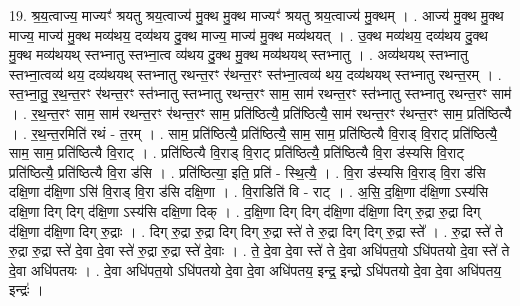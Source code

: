 \documentclass[17pt]{extarticle}
\begin{document}
19. श्र॒य॒त्वाज्य॒ माज्यꣳ॑ श्रयतु श्रय॒त्वाज्य॑ मु॒क्थ मु॒क्थ माज्यꣳ॑ श्रयतु श्रय॒त्वाज्य॑ मु॒क्थम् । . आज्य॑ मु॒क्थ मु॒क्थ माज्य॒ माज्य॑ मु॒क्थ मव्य॑थय॒ दव्य॑थय दु॒क्थ माज्य॒ माज्य॑ मु॒क्थ मव्य॑थयत् । . उ॒क्थ मव्य॑थय॒ दव्य॑थय दु॒क्थ मु॒क्थ मव्य॑थयथ् स्तभ्नातु स्तभ्ना॒त्व व्य॑थय दु॒क्थ मु॒क्थ मव्य॑थयथ् स्तभ्नातु । . अव्य॑थयथ् स्तभ्नातु स्तभ्ना॒त्वव्य॑ थय॒ दव्य॑थयथ् स्तभ्नातु रथन्त॒रꣳ र॑थन्त॒रꣳ स्त॑भ्ना॒त्वव्य॑ थय॒ दव्य॑थयथ् स्तभ्नातु रथन्त॒रम् । . स्त॒भ्ना॒तु॒ र॒थ॒न्त॒रꣳ र॑थन्त॒रꣳ स्त॑भ्नातु स्तभ्नातु रथन्त॒रꣳ साम॒ साम॑ रथन्त॒रꣳ स्त॑भ्नातु स्तभ्नातु रथन्त॒रꣳ साम॑ । . र॒थ॒न्त॒रꣳ साम॒ साम॑ रथन्त॒रꣳ र॑थन्त॒रꣳ साम॒ प्रति॑ष्ठित्यै॒ प्रति॑ष्ठित्यै॒ साम॑ रथन्त॒रꣳ र॑थन्त॒रꣳ साम॒ प्रति॑ष्ठित्यै । . र॒थ॒न्त॒रमिति॑ रथं - त॒रम् । . साम॒ प्रति॑ष्ठित्यै॒ प्रति॑ष्ठित्यै॒ साम॒ साम॒ प्रति॑ष्ठित्यै वि॒राड् वि॒राट् प्रति॑ष्ठित्यै॒ साम॒ साम॒ प्रति॑ष्ठित्यै वि॒राट् । . प्रति॑ष्ठित्यै वि॒राड् वि॒राट् प्रति॑ष्ठित्यै॒ प्रति॑ष्ठित्यै वि॒रा ड॑स्यसि वि॒राट् प्रति॑ष्ठित्यै॒ प्रति॑ष्ठित्यै वि॒रा ड॑सि । . प्रति॑ष्ठित्या॒ इति॒ प्रति॑ - स्थि॒त्यै॒ । . वि॒रा ड॑स्यसि वि॒राड् वि॒रा ड॑सि दक्षि॒णा द॑क्षि॒णा ऽसि॑ वि॒राड् वि॒रा ड॑सि दक्षि॒णा । . वि॒राडिति॑ वि - राट् । . अ॒सि॒ द॒क्षि॒णा द॑क्षि॒णा ऽस्य॑सि दक्षि॒णा दिग् दिग् द॑क्षि॒णा ऽस्य॑सि दक्षि॒णा दिक् । . द॒क्षि॒णा दिग् दिग् द॑क्षि॒णा द॑क्षि॒णा दिग् रु॒द्रा रु॒द्रा दिग् द॑क्षि॒णा द॑क्षि॒णा दिग् रु॒द्राः । . दिग् रु॒द्रा रु॒द्रा दिग् दिग् रु॒द्रा स्ते॑ ते रु॒द्रा दिग् दिग् रु॒द्रा स्ते᳚ । . रु॒द्रा स्ते॑ ते रु॒द्रा रु॒द्रा स्ते॑ दे॒वा दे॒वा स्ते॑ रु॒द्रा रु॒द्रा स्ते॑ दे॒वाः । . ते॒ दे॒वा दे॒वा स्ते॑ ते दे॒वा अधि॑पत॒यो ऽधि॑पतयो दे॒वा स्ते॑ ते दे॒वा अधि॑पतयः । . दे॒वा अधि॑पत॒यो ऽधि॑पतयो दे॒वा दे॒वा अधि॑पतय॒ इन्द्र॒ इन्द्रो ऽधि॑पतयो दे॒वा दे॒वा अधि॑पतय॒ इन्द्रः॑ । \newline
\end{document}
